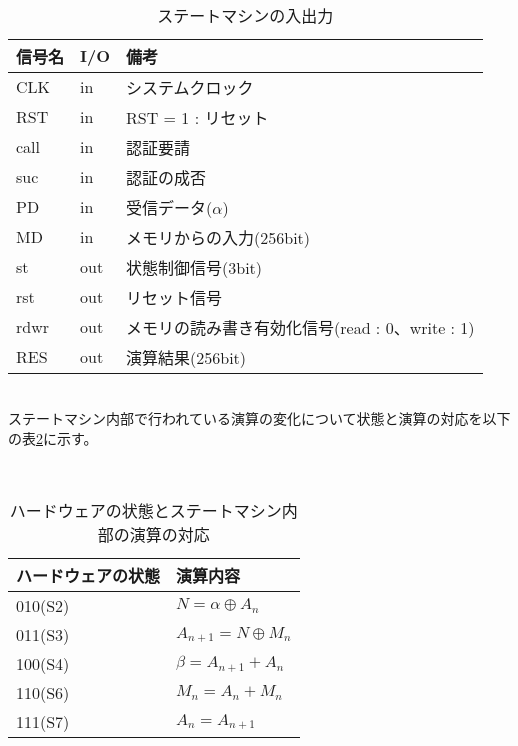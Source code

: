 \documentclass{thesis}
\begin{document}
\begin{table}[htb]
　\begin{center}
\caption{ステートマシンの入出力}
\label{ALUIO}
  \begin{tabular}{|p{2cm}|p{1cm}|p{10cm}|} \hline
  信号名 & I/O & 備考 \\ \hline \hline
   CLK   &  in   & システムクロック  \\ \hline
   RST   &  in   &  RST = 1 : リセット  \\ \hline
   call   &  in   & 認証要請  \\ \hline
   suc   &  in   & 認証の成否  \\ \hline
   PD  &  in    &  受信データ($\alpha$)  \\ \hline
   MD  &  in    &  メモリからの入力(256bit)  \\ \hline
   st   &  out  &  状態制御信号(3bit)  \\ \hline
   rst   &  out   &  リセット信号  \\ \hline
   rdwr   &  out   &  メモリの読み書き有効化信号(read : 0、write : 1)  \\ \hline
   RES   &  out  &  演算結果(256bit)  \\ \hline
  \end{tabular}
  \end{center}
\end{table}　\\

ステートマシン内部で行われている演算の変化について状態と演算の対応を以下の表\ref{ALU演算}に示す。

\begin{table}[htb]
　\begin{center}
\caption{ハードウェアの状態とステートマシン内部の演算の対応}
\label{ALU演算}
  \begin{tabular}{|p{4cm}|p{5cm}|} \hline
  ハードウェアの状態 & 演算内容  \\ \hline \hline
   010(S2)   &  $N = \alpha \oplus A_n$   \\ \hline
   011(S3)   &  $A_{n+1} = N \oplus M_n$  \\ \hline
   100(S4)   &  $\beta = A_{n+1} + A_n$    \\ \hline
   110(S6)   &  $M_n = A_n + M_n$    \\ \hline
   111(S7)   &  $A_n = A_{n+1}$    \\ \hline
  \end{tabular}
  \end{center}
\end{table}　\\
\end{document}
